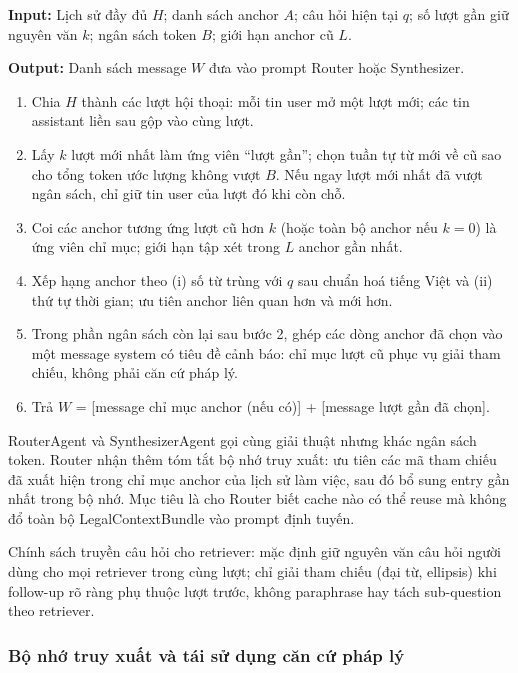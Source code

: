 \documentclass[../DoAn.tex]{subfiles}
\begin{document}
\begin{algorithm}[H]
\footnotesize
\textbf{Input:} Lịch sử đầy đủ $H$; danh sách anchor $A$; câu hỏi hiện tại $q$; số lượt gần giữ nguyên văn $k$; ngân sách token $B$; giới hạn anchor cũ $L$.

\textbf{Output:} Danh sách message $W$ đưa vào prompt Router hoặc Synthesizer.

\begin{enumerate}[label=\textbf{Bước \arabic*.}, leftmargin=1.6cm]
    \item Chia $H$ thành các lượt hội thoại: mỗi tin user mở một lượt mới; các tin assistant liền sau gộp vào cùng lượt.
    \item Lấy $k$ lượt mới nhất làm ứng viên ``lượt gần''; chọn tuần tự từ mới về cũ sao cho tổng token ước lượng không vượt $B$. Nếu ngay lượt mới nhất đã vượt ngân sách, chỉ giữ tin user của lượt đó khi còn chỗ.
    \item Coi các anchor tương ứng lượt cũ hơn $k$ (hoặc toàn bộ anchor nếu $k=0$) là ứng viên chỉ mục; giới hạn tập xét trong $L$ anchor gần nhất.
    \item Xếp hạng anchor theo (i) số từ trùng với $q$ sau chuẩn hoá tiếng Việt và (ii) thứ tự thời gian; ưu tiên anchor liên quan hơn và mới hơn.
    \item Trong phần ngân sách còn lại sau bước 2, ghép các dòng anchor đã chọn vào một message system có tiêu đề cảnh báo: chỉ mục lượt cũ phục vụ giải tham chiếu, không phải căn cứ pháp lý.
    \item Trả $W$ = [message chỉ mục anchor (nếu có)] + [message lượt gần đã chọn].
\end{enumerate}
\caption{Giải thuật dựng lịch sử làm việc theo ngân sách token}
\label{algo:build_working_history}
\end{algorithm}

RouterAgent và SynthesizerAgent gọi cùng giải thuật nhưng khác ngân sách token. Router nhận thêm tóm tắt bộ nhớ truy xuất: ưu tiên các mã tham chiếu đã xuất hiện trong chỉ mục anchor của lịch sử làm việc, sau đó bổ sung entry gần nhất trong bộ nhớ. Mục tiêu là cho Router biết cache nào có thể reuse mà không đổ toàn bộ LegalContextBundle vào prompt định tuyến.

Chính sách truyền câu hỏi cho retriever: mặc định giữ nguyên văn câu hỏi người dùng cho mọi retriever trong cùng lượt; chỉ giải tham chiếu (đại từ, ellipsis) khi follow-up rõ ràng phụ thuộc lượt trước, không paraphrase hay tách sub-question theo retriever.

\subsubsection{Bộ nhớ truy xuất và tái sử dụng căn cứ pháp lý}
\end{document}
